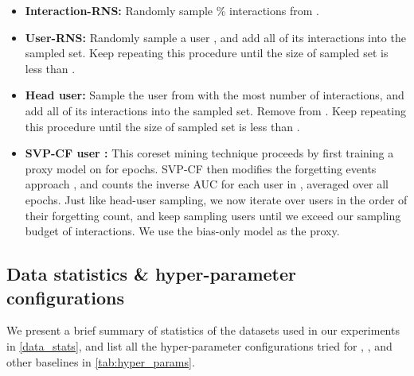 \documentclass{article}
\begin{document}
\begin{itemize}[leftmargin=.3in]
    \item \textbf{Interaction-RNS:} Randomly sample \% interactions from .
    
    \item \textbf{User-RNS:} Randomly sample a user , and add all of its interactions into the sampled set. Keep repeating this procedure until the size of sampled set is less than .
    
    \item \textbf{Head user:} Sample the user  from  with the most number of interactions, and add all of its interactions into the sampled set. Remove  from . Keep repeating this procedure until the size of sampled set is less than .
    
    \item \textbf{SVP-CF user \cite{wsdm22}:} This coreset mining technique proceeds by first training a proxy model on  for  epochs. SVP-CF then modifies the forgetting events approach \cite{forgetting_events}, and counts the inverse AUC for each user in , averaged over all  epochs. Just like head-user sampling, we now iterate over users in the order of their forgetting count, and keep sampling users until we exceed our sampling budget of  interactions. We use the bias-only model as the proxy.
\end{itemize}

\subsection{Data statistics \& hyper-parameter configurations} \label{appendix:hyper_params}

We present a brief summary of statistics of the datasets used in our experiments in \cref{data_stats}, and list all the hyper-parameter configurations tried for \model, \sampler, and other baselines in \cref{tab:hyper_params}.
\end{document}
